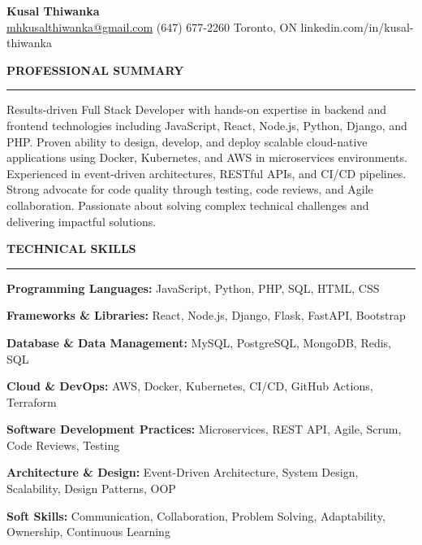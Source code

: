 \documentclass[10pt,letterpaper]{article}
\begin{document}
\begin{center}
{\LARGE\textbf{Kusal Thiwanka}}\\[3pt]
\href{mailto:mhkusalthiwanka@gmail.com}{mhkusalthiwanka@gmail.com}\hspace{2em}%
(647) 677{-}2260\hspace{2em}%
Toronto, ON\hspace{2em}
linkedin.com/in/kusal-thiwanka
\end{center}

\vspace{6pt}

\textbf{PROFESSIONAL SUMMARY}\\[-8pt]
\noindent\rule{\textwidth}{1pt}

\vspace{-2pt}

Results-driven Full Stack Developer with hands-on expertise in backend and frontend technologies including JavaScript, React, Node.js, Python, Django, and PHP. Proven ability to design, develop, and deploy scalable cloud-native applications using Docker, Kubernetes, and AWS in microservices environments. Experienced in event-driven architectures, RESTful APIs, and CI/CD pipelines. Strong advocate for code quality through testing, code reviews, and Agile collaboration. Passionate about solving complex technical challenges and delivering impactful solutions.

\vspace{8pt}

\textbf{TECHNICAL SKILLS}\\[-8pt]
\noindent\rule{\textwidth}{1pt}

\vspace{-2pt}

\textbf{Programming Languages:} JavaScript, Python, PHP, SQL, HTML, CSS

\textbf{Frameworks \& Libraries:} React, Node.js, Django, Flask, FastAPI, Bootstrap

\textbf{Database \& Data Management:} MySQL, PostgreSQL, MongoDB, Redis, SQL

\textbf{Cloud \& DevOps:} AWS, Docker, Kubernetes, CI/CD, GitHub Actions, Terraform

\textbf{Software Development Practices:} Microservices, REST API, Agile, Scrum, Code Reviews, Testing

\textbf{Architecture \& Design:} Event-Driven Architecture, System Design, Scalability, Design Patterns, OOP

\textbf{Soft Skills:} Communication, Collaboration, Problem Solving, Adaptability, Ownership, Continuous Learning
\end{document}
